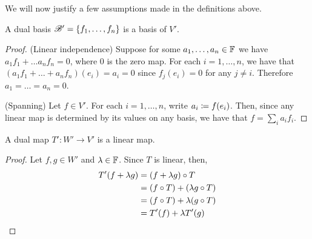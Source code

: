 \documentclass{styles/tufte}
\begin{document}
%  
%  

We will now justify a few assumptions made in the definitions above.

\begin{proposition}{}{}
  A dual basis $\mathscr{B}' = \set{f_1, \dots, f_n}$ is a basis of $V'$.
\end{proposition}
\begin{proof}
  (Linear independence) Suppose for some $a_1, \dots, a_n \in \mathbb{F}$ we have $a_1 f_1 + \dots a_n f_n = 0$, where $0$ is the zero map. For each $i = 1, \dots, n$, we have that $(a_1 f_1 + \dots + a_n f_n)(e_i) = a_i = 0$ since $f_j(e_i) = 0$ for any $j \neq i$. Therefore $a_1 = \dots = a_n = 0$.
  
  (Spanning) Let $f \in V'$. For each $i = 1, \dots, n$, write $a_i \coloneqq f(e_i)$. Then, since any linear map is determined by its values on any basis, we have that $f = \sum_i a_i f_i$.
\end{proof}

\begin{proposition}{}{}
  A dual map $T': W' \to V'$ is a linear map.
\end{proposition}
\begin{proof}
  Let $f, g \in W'$ and $\lambda \in \mathbb{F}$. Since $T$ is linear, then,
  \begin{align*}
    T'(f + \lambda g)
    &= (f + \lambda g) \circ T \\
    &= (f \circ T) + (\lambda g \circ T) \\
    &= (f \circ T) + \lambda (g \circ T) \\
    &= T'(f) + \lambda T'(g) \qedhere
  \end{align*}
\end{proof}
\end{document}
